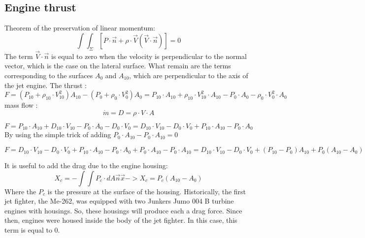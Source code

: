 \documentclass[12pt,a4paper]{article}
\begin{document}
\subsection{Engine thrust}
Theorem of the preservation of linear momentum:
\begin{equation}
    \int \int_{\Sigma} [P \cdot \vec{n}+ \rho \cdot \vec{V} (\vec{V} \cdot \vec{n})] = 0
\end{equation}
The term $\vec{V} \cdot \vec{n}$ is equal to zero when the velocity is perpendicular to the normal vector, which is the case on the lateral surface.
What remain are the terms corresponding to the surfaces $A_0$ and $A_{10}$, which are perpendicular to the axis of the jet engine.
The thrust :
\begin{dmath}
    F = (P_{10} + \rho_{10} \cdot V_{10}^2) A_{10} - (P_{0} + \rho_{0} \cdot V_{0}^2) A_0 = P_{10} \cdot A_{10} + \rho_{10} \cdot V_{10}^2 \cdot A_{10} - P_{0} \cdot A_0 - \rho_{0} \cdot V_{0}^2 \cdot A_0
\end{dmath}
mass flow :
\begin{equation}
    \dot{m} = D = \rho \cdot V \cdot A
\end{equation}

\begin{dmath}
    F = P_{10} \cdot A_{10} + D_{10} \cdot V_{10} - P_{0} \cdot A_0 - D_{0} \cdot V_{0} = D_{10} \cdot V_{10} - D_{0} \cdot V_{0} + P_{10} \cdot A_{10} - P_{0} \cdot A_0
\end{dmath}
By using the simple trick of adding $P_0 \cdot A_{10} - P_0 \cdot A_{10}=0$

\begin{dmath}
    F = D_{10} \cdot V_{10} - D_{0} \cdot V_{0} + P_{10} \cdot A_{10} - P_{0} \cdot A_0 + P_0 \cdot A_{10} - P_0 \cdot A_{10} = D_{10} \cdot V_{10} - D_{0} \cdot V_{0} + (P_{10} - P_0) A_{10} + P_0 (A_{10} -A_0)
\end{dmath}

It is useful to add the drag due to the engine housing:
\begin{equation}
    X_c = - \int \int P_c \cdot dA \vec{n} \vec{x} -> X_c = P_c (A_{10} - A_0)
\end{equation}
Where the $P_c$ is the pressure at the surface of the housing.
Historically, the first jet fighter, the Me-262, was equipped with two Junkers Jumo 004 B turbine engines with housings. So, these housings will produce each a drag force.
Since then, engines were housed inside the body of the jet fighter. In this case, this term is equal to 0.
\end{document}
